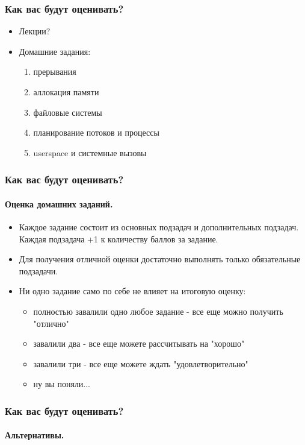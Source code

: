 \begin{frame}
\frametitle{Как вас будут оценивать?}

\begin{itemize}
  \item<1-> Лекции?  
  \item<4-> Домашние задания:
    \begin{enumerate}
      \item<5-> прерывания
      \item<6-> аллокация памяти
      \item<7-> файловые системы
      \item<8-> планирование потоков и процессы
      \item<9-> userspace и системные вызовы
    \end{enumerate}
\end{itemize}
\end{frame}

\begin{frame}
\frametitle{Как вас будут оценивать?}
\framesubtitle{Оценка домашних заданий.}

\begin{itemize}
  \item<1-> Каждое задание состоит из основных подзадач и дополнительных
            подзадач. Каждая подзадача +1 к количеству баллов за задание.
  \item<2-> Для получения отличной оценки достаточно выполнять только
            обязательные подзадачи.
  \item<3-> Ни одно задание само по себе не влияет на итоговую оценку:
    \begin{itemize}
      \item<4-> полностью завалили одно любое задание - все еще можно получить
                "отлично"
      \item<5-> завалили два - все еще можете рассчитывать на "хорошо"
      \item<6-> завалили три - все еще можете ждать "удовлетворительно"
      \item<7-> ну вы поняли...
    \end{itemize}
\end{itemize}
\end{frame}

\begin{frame}
\frametitle{Как вас будут оценивать?}
\framesubtitle{Альтернативы.}

\end{frame}
